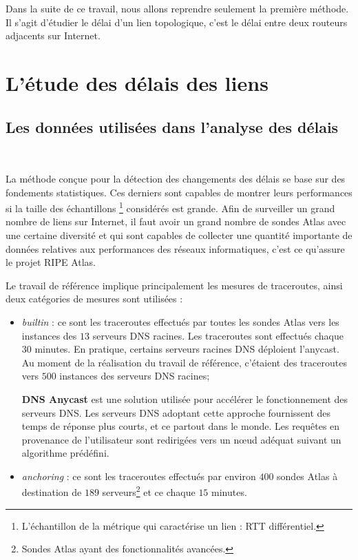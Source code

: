 Dans la suite de ce travail, nous allons reprendre seulement la première méthode.  Il s'agit d'étudier le délai d'un lien topologique, c'est le délai entre deux routeurs adjacents sur Internet.
 

\section{L'étude des délais des liens }
 
\subsection{Les données utilisées dans l'analyse des délais}~

La méthode conçue pour la détection des changements des délais se base sur des fondements statistiques. Ces derniers sont capables de montrer leurs performances si la taille des échantillons \footnote{L'échantillon de la métrique qui caractérise un lien : RTT différentiel.} considérés est grande.   Afin de surveiller un grand nombre de liens sur Internet, il faut avoir un grand nombre de sondes Atlas avec une certaine diversité et  qui sont capables de collecter une quantité importante de données relatives aux performances des réseaux informatiques, c'est ce qu'assure le projet RIPE Atlas.

 Le travail de référence implique principalement les mesures de traceroutes, ainsi deux catégories de mesures sont utilisées :

\begin{itemize}
	\item \textit{builtin} : ce sont les traceroutes effectués par toutes les sondes Atlas vers les instances des  $13$ serveurs DNS racines. Les traceroutes sont effectués chaque $30$ minutes. En pratique, certains serveurs racines DNS déploient l'anycast. Au moment de la réalisation du travail de référence, c'étaient des traceroutes vers $ 500 $ instances des serveurs DNS racines;
	\begin{tcolorbox}
		 \textbf{DNS Anycast} est une solution   utilisée pour accélérer le fonctionnement  des serveurs DNS. Les serveurs DNS adoptant cette approche fournissent des temps de réponse plus courts, et ce partout dans le monde. Les requêtes en provenance de l'utilisateur sont redirigées vers un n\oe{}ud adéquat suivant un algorithme prédéfini. 
	\end{tcolorbox}
	
	\item \textit{anchoring} : ce sont les traceroutes effectués par environ $400$ sondes Atlas à destination de $189$ serveurs\footnote{Sondes Atlas ayant des fonctionnalités avancées.} et ce chaque $15$ minutes.
\end{itemize}

